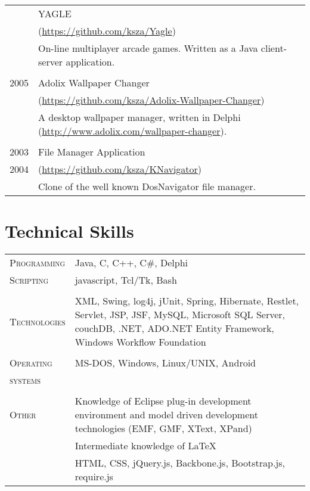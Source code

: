\documentclass[a4paper,10pt]{article}
\begin{document}
\begin{longtable}{p{2.5cm}|p{11cm}}
 & YAGLE\\
 &\footnotesize{(\url{https://github.com/ksza/Yagle})}\\
 & \footnotesize{On-line multiplayer arcade games. Written as a Java
client-server application.}\\ \multicolumn{2}{c}{} \\
 
 \raggedleft \textsc{2005} & Adolix Wallpaper Changer \\
 &
 \footnotesize{(\url{https://github.com/ksza/Adolix-Wallpaper-Changer})}\\
 & \footnotesize{A
 desktop wallpaper manager, written in Delphi
 (\url{http://www.adolix.com/wallpaper-changer}).} \\
 \multicolumn{2}{c}{} \\
 
  \raggedleft \textsc{2003} & File Manager Application \\
  \raggedleft \textsc{2004} &
 \footnotesize{(\url{https://github.com/ksza/KNavigator})}\\
 & \footnotesize{Clone of the well known
DosNavigator file manager.} \\
\end{longtable}

\section{Technical Skills}
\begin{tabular}{p{2.5cm}p{11cm}}
\textsc{Programming} & Java, C, C++, C\#, Delphi\\
\textsc{Scripting} & javascript, Tcl/Tk, Bash\\ 
\multicolumn{2}{c}{} \\ 
\textsc{Technologies} & XML, Swing, log4j, jUnit, Spring, Hibernate, Restlet, Servlet, JSP, JSF, MySQL, Microsoft SQL Server, couchDB, .NET, ADO.NET Entity Framework, Windows Workflow Foundation\\ 
 \multicolumn{2}{c}{} \\
 \textsc{Operating} & MS-DOS, Windows, Linux/UNIX, Android\\
 \textsc{systems}&\\ 
 \multicolumn{2}{c}{} \\
 \textsc{Other} & Knowledge of Eclipse plug-in development environment and model
 driven development technologies (EMF, GMF, XText, XPand)\\
 & Intermediate knowledge of \LaTeX \\
 & HTML, CSS, jQuery.js, Backbone.js, Bootstrap.js, require.js\\
\end{tabular}
\end{document}
